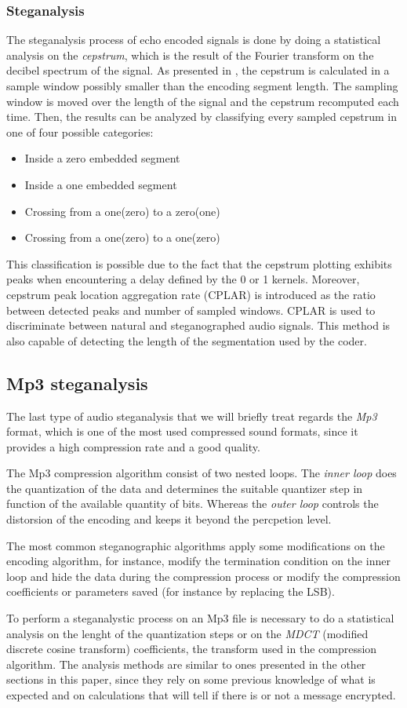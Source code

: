 \documentclass[../../main.tex]{subfiles}
\begin{document}
\subsubsection{Steganalysis}
The steganalysis process of echo encoded signals is done by doing a
statistical analysis on the \emph{cepstrum}, which is the result of the
Fourier transform on the decibel spectrum of the signal.
As presented in \cite{review-audio-steganalysis}, the cepstrum is calculated
in a sample window possibly smaller than the encoding segment length.
The sampling window is moved over the length of the signal and the cepstrum
recomputed each time.
Then, the results can be analyzed by classifying every sampled cepstrum in
one of four possible categories:
\begin{itemize}[noitemsep]
    \item Inside a zero embedded segment
    \item Inside a one embedded segment
    \item Crossing from a one(zero) to a zero(one)
    \item Crossing from a one(zero) to a one(zero)
\end{itemize}
This classification is possible due to the fact that the cepstrum plotting
exhibits peaks when encountering a delay defined by the 0 or 1 kernels.
Moreover, cepstrum peak location aggregation rate (CPLAR) is introduced as
the ratio between detected peaks and number of sampled windows.
CPLAR is used to discriminate between natural and steganographed audio
signals.
This method is also capable of detecting the length of the segmentation
used by the coder.

\subsection{Mp3 steganalysis}
The last type of audio steganalysis that we will briefly treat regards the
\emph{Mp3} format, which is one of the most used compressed sound formats,
since it provides a high compression rate and a good quality.

The Mp3 compression algorithm consist of two nested loops.
The \emph{inner loop} does the quantization of the data and determines the
suitable quantizer step in function of the available quantity of bits.
Whereas the \emph{outer loop} controls the distorsion of the encoding and
keeps it beyond the percpetion level.

The most common steganographic algorithms apply some modifications on the
encoding algorithm, for instance, modify the termination condition on the
inner loop and hide the data during the compression process or modify the
compression coefficients or parameters saved (for instance by replacing the
LSB).

To perform a steganalystic process on an Mp3 file is necessary to do a
statistical analysis on the lenght of the quantization steps or on the
\emph{MDCT} (modified discrete cosine transform) coefficients, the transform
used in the compression algorithm.
The analysis methods are similar to ones presented in the other sections in
this paper, since they rely on some previous knowledge of what is expected
and on calculations that will tell if there is or not a message encrypted.
\end{document}
